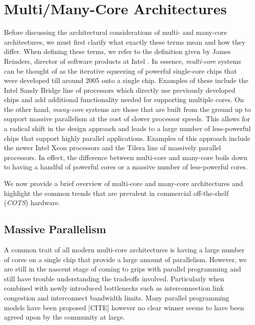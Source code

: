 \section{Multi/Many-Core Architectures}
\label{sec:overview}

Before discussing the architectural considerations of multi- and many-core
architectures, we must first clarify what exactly these terms mean and how they
differ. When defining these terms, we refer to the definition given by James Reinders,
director of software products at Intel \cite{Re:12}. In essence, \emph{multi-core} systems
can be thought of as the iterative squeezing of powerful single-core chips that
were developed till around 2005 onto a single chip. Examples of these include the Intel
Sandy Bridge line of processors which directly use previously developed chips
and add additional functionality needed for supporting multiple cores. On the other hand, 
\emph{many-core} systems are those that are built from the ground up to support massive
parallelism at the cost of slower processor speeds. This allows for a radical shift in the
design approach and leads to a large number of less-powerful chips that support highly
parallel applications. Examples of this approach include the newer Intel Xeon processors
and the Tilera line of massively parallel processors. In effect, the difference between
multi-core and many-core boils down to having a handful of powerful cores or a massive
number of less-powerful cores.

We now provide a brief overview of multi-core and many-core architectures and
highlight the common trends that are prevalent in commercial off-the-shelf
(\emph{COTS}) hardware.

\subsection{Massive Parallelism}

A common trait of all modern multi-core architectures is having a large number of cores on a
single chip that provide a large amount of parallelism. However, we are still in the nascent
stage of coming to grips with parallel programming and still have trouble understanding the
tradeoffs involved. Particularly when combined with newly introduced bottlenecks such as
interconnection link congestion and interconnect bandwidth limits. Many parallel programming 
models have been proposed [CITE] however no clear winner seems to have been agreed upon
by the community at large.


